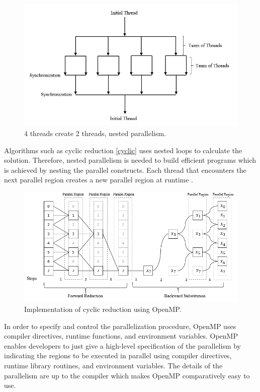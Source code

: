 \documentclass[12pt, oneside]{book}
\theoremstyle{plain}
\theoremstyle{definition}
\begin{document}
\begin{figure}[!htb]
    \centering
        \includegraphics[scale=0.6]{openmpnested.png}
    \caption{4 threads create 2 threads, nested parallelism.}
\end{figure}

Algorithms such as cyclic reduction \ref{cyclic} uses nested loops to calculate the solution. Therefore, nested parallelism is needed to build efficient programs which is achieved by nesting the parallel constructs. Each thread that encounters the next parallel region creates a new parallel region at runtime \cite{openmpnext}.

\begin{figure}[!htb]
    \centering
        \includegraphics[scale=0.8]{cyclicopenmp.png}
    \caption{Implementation of cyclic reduction using OpenMP.}
\end{figure}

In order to specify and control the parallelization procedure, OpenMP uses compiler directives, runtime functions, and environment variables. OpenMP enables developers to just give a high-level specification of the parallelism by indicating the regions to be executed in parallel using compiler directives, runtime library routines, and environment variables. The details of the parallelism are up to the compiler which makes OpenMP comparatively easy to use. 
\end{document}
